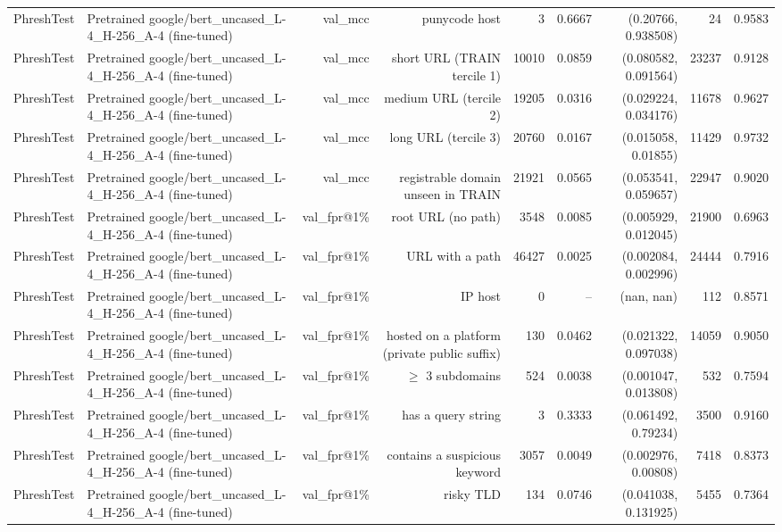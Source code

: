 \begin{table}[t]
\begin{tabular}{llrrrrrrr}
PhreshTest & Pretrained google/bert\_uncased\_L-4\_H-256\_A-4 (fine-tuned) & val\_mcc & punycode host & 3 & 0.6667 & (0.20766, 0.938508) & 24 & 0.9583 \\
PhreshTest & Pretrained google/bert\_uncased\_L-4\_H-256\_A-4 (fine-tuned) & val\_mcc & short URL (TRAIN tercile 1) & 10010 & 0.0859 & (0.080582, 0.091564) & 23237 & 0.9128 \\
PhreshTest & Pretrained google/bert\_uncased\_L-4\_H-256\_A-4 (fine-tuned) & val\_mcc & medium URL (tercile 2) & 19205 & 0.0316 & (0.029224, 0.034176) & 11678 & 0.9627 \\
PhreshTest & Pretrained google/bert\_uncased\_L-4\_H-256\_A-4 (fine-tuned) & val\_mcc & long URL (tercile 3) & 20760 & 0.0167 & (0.015058, 0.01855) & 11429 & 0.9732 \\
PhreshTest & Pretrained google/bert\_uncased\_L-4\_H-256\_A-4 (fine-tuned) & val\_mcc & registrable domain unseen in TRAIN & 21921 & 0.0565 & (0.053541, 0.059657) & 22947 & 0.9020 \\
PhreshTest & Pretrained google/bert\_uncased\_L-4\_H-256\_A-4 (fine-tuned) & val\_fpr@1\% & root URL (no path) & 3548 & 0.0085 & (0.005929, 0.012045) & 21900 & 0.6963 \\
PhreshTest & Pretrained google/bert\_uncased\_L-4\_H-256\_A-4 (fine-tuned) & val\_fpr@1\% & URL with a path & 46427 & 0.0025 & (0.002084, 0.002996) & 24444 & 0.7916 \\
PhreshTest & Pretrained google/bert\_uncased\_L-4\_H-256\_A-4 (fine-tuned) & val\_fpr@1\% & IP host & 0 & -- & (nan, nan) & 112 & 0.8571 \\
PhreshTest & Pretrained google/bert\_uncased\_L-4\_H-256\_A-4 (fine-tuned) & val\_fpr@1\% & hosted on a platform (private public suffix) & 130 & 0.0462 & (0.021322, 0.097038) & 14059 & 0.9050 \\
PhreshTest & Pretrained google/bert\_uncased\_L-4\_H-256\_A-4 (fine-tuned) & val\_fpr@1\% & $\geq$ 3 subdomains & 524 & 0.0038 & (0.001047, 0.013808) & 532 & 0.7594 \\
PhreshTest & Pretrained google/bert\_uncased\_L-4\_H-256\_A-4 (fine-tuned) & val\_fpr@1\% & has a query string & 3 & 0.3333 & (0.061492, 0.79234) & 3500 & 0.9160 \\
PhreshTest & Pretrained google/bert\_uncased\_L-4\_H-256\_A-4 (fine-tuned) & val\_fpr@1\% & contains a suspicious keyword & 3057 & 0.0049 & (0.002976, 0.00808) & 7418 & 0.8373 \\
PhreshTest & Pretrained google/bert\_uncased\_L-4\_H-256\_A-4 (fine-tuned) & val\_fpr@1\% & risky TLD & 134 & 0.0746 & (0.041038, 0.131925) & 5455 & 0.7364 \\

\end{tabular}
\end{table}
